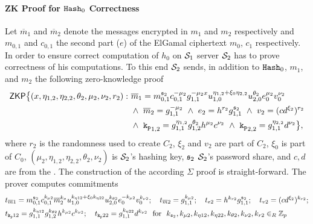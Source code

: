 \paragraph{ZK Proof for $\mathtt{Hash}_0$ Correctness}
Let $\overline{m}_1$ and $\overline{m}_2$ denote the messages encrypted in $m_1$ and $m_2$ respectively and $m_{0,1}$ and $c_{0,1}$ the second part ($e$) of the ElGamal ciphertext $m_0$, $c_1$ respectively.
In order to ensure correct computation of $h_0$ on $\mathcal{S}_1$ server $\mathcal{S}_2$ has to prove correctness of his computations.
To this end $\mathcal{S}_2$ sends, in addition to $\mathtt{Hash}_0$, $m_1$, and $m_2$ the following zero-knowledge proof 
\begin{equation}
\begin{split}
    \mathsf{ZKP}\big\{ (x, \eta_{1,2}, \eta_{2,2}, \theta_2, \mu_2, \nu_2, r_2): ~ &  
      \overline{m}_1 = m_{0,1}^{\mathfrak{s}_2} c_{0,1}^{-\mu_2} g_{1,1}^{-\mu_2 x} u_{1,0}^{\eta_{1,2} + \xi_0 \eta_{2,2}} u_{2,0}^{\theta_2} e_0^{\mu_2} v_0^{\nu_2} \\
      & \wedge ~ \overline{m}_2 = g_{1,1}^{-\mu_2} ~ \wedge ~ e_2 = h^{r_2}g_{1,1}^{\mathfrak{s}_2} ~ \wedge ~ v_2 = (cd^{\xi_2})^{r_2} \\
      & \wedge ~ \mathtt{k_p}_{1,2} = g_{1,1}^{\eta_{1,2}} g_{1,2}^{\theta_2} h^{\mu_2} c^{\nu_2} ~ \wedge ~ \mathtt{k_p}_{2,2} = g_{1,1}^{\eta_{2,2}} d^{\nu_2}
      \big\},
\end{split}
\end{equation}
where $r_2$ is the randomness used to create $C_2$, $\xi_2$ and $v_2$ are part of $C_2$, $\xi_0$ is part of $C_0$, $(\mu_2, \eta_{1,2}, \eta_{2,2}, \theta_2, \nu_2)$ is $\mathcal{S}_2$'s hashing key, $\mathfrak{s}_2$ $\mathcal{S}_2$'s password share, and $c,d$ are from the \crs.
The construction of the according $\Sigma$ proof is straight-forward.
The prover computes commitments
\begin{align*}
  & t_{\overline{m}1} = m_{0,1}^{{\mathfrak{s}_2}} c_{0,1}^{k_{\mu2}} \overline{m}_{2}^{k_{x}} u_{1,0}^{k_{\eta12} + \xi_0 k_{\eta22}} u_{2,0}^{k_{\theta2}} e_0^{-k_{\mu2}} v_0^{k_{\nu2}}; ~~~
    t_{\overline{m}2} = g_{1,1}^{k_{\mu2}}; ~~~  t_{e2} = h^{k_{r2}}g_{1,1}^{{\mathfrak{s}_2}}; ~~~ t_{v2} = (cd^{\xi_2})^{k_{r2}}; \\
  & t_{\mathtt{k_p}12} = g_{1,1}^{k_{\eta12}} g_{1,2}^{k_{\theta2}} h^{k_{\mu2}} c^{k_{\nu2}}; ~~~ t_{\mathtt{k_p}22} = g_{1,1}^{k_{\eta22}} d^{k_{\nu2}}
    \text{ ~for~ } k_{\mathfrak{s}_2}, k_{\mu2}, k_{\eta12}, k_{\eta22}, k_{\theta2}, k_{\nu2}, k_{r2} \in_R \mathbb{Z}_p
\end{align*}
